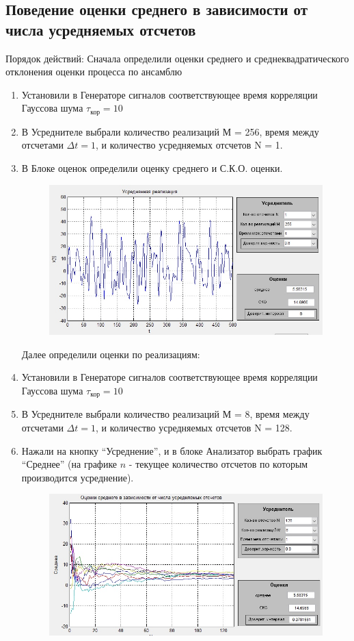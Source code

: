 \subsection[Задание 2]{Поведение оценки среднего в зависимости от числа усредняемых отсчетов}
Порядок действий:
Сначала определили оценки среднего и среднеквадратического отклонения оценки процесса по ансамблю
\begin{enumerate}
	\item Установили в Генераторе сигналов соответствующее время корреляции Гауссова шума $\tau_\text{кор} = 10$
	\item В Усреднителе выбрали количество реализаций М = 256, время между отсчетами $\Delta t = 1$, и количество усредняемых отсчетов N = 1.
	\item 	В Блоке оценок определили оценку среднего и С.К.О. оценки.	
	\begin{figure}[H]
		\centering
		\includegraphics[width=\linewidth]{tasks/task2/realize_mean}
	\end{figure}

	Далее определили оценки по реализациям:
	\item Установили в Генераторе сигналов соответствующее время корреляции Гауссова шума $\tau_\text{кор} = 10$
	\item В Усреднителе выбрали количество реализаций М = 8, время между отсчетами $\Delta t = 1$, и количество усредняемых отсчетов N = 128.
	\item Нажали на кнопку “Усреднение”, и в блоке Анализатор выбрать график “Среднее” (на графике $n$ - текущее количество отсчетов по которым производится усреднение).
	\begin{figure}[H]
		\centering
		\includegraphics[width=\linewidth]{tasks/task2/realize_mean2}
	\end{figure}


\end{enumerate}
